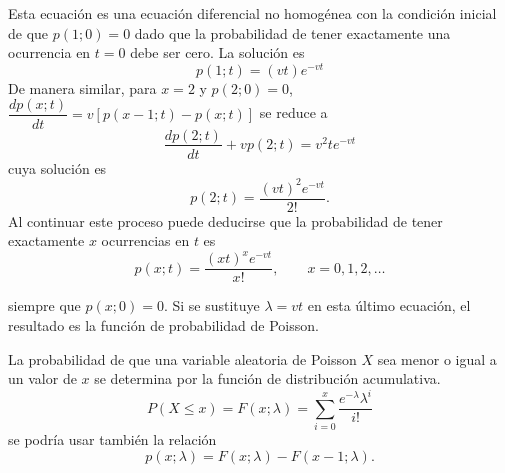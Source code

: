 Esta ecuación es una ecuación diferencial no homogénea con la condición inicial de que $p(1;0)=0$ dado que la probabilidad de tener exactamente una ocurrencia en $t=0$ debe ser cero.  La solución es
$$p(1;t)=(vt) e^{-vt}$$
De manera similar, para $x=2$ y $p(2;0)=0$, $\dfrac{dp(x;t)}{dt}=v[p(x-1;t)-p(x;t)]$ se reduce a
$$\dfrac{dp(2;t)}{dt} + vp(2;t) = v^2te^{-vt}$$
cuya solución es 
$$p(2;t)=\dfrac{(vt)^2e^{-vt}}{2!}.$$
Al continuar este proceso puede deducirse que la probabilidad de tener exactamente $x$ ocurrencias en $t$ es 
$$p(x;t)=\dfrac{(xt)^x e^{-vt}}{x!},\qquad x=0,1,2,\ldots$$

siempre que $p(x;0)=0$. Si se sustituye $\lambda =vt$ en esta último ecuación, el resultado es la función de probabilidad de Poisson.\\

\begin{tcolorbox}[colback=white]
    La probabilidad de que una variable aleatoria de Poisson $X$ sea menor o igual a un valor de $x$ se determina por la función de distribución acumulativa.
    $$P(X\leq x)=F(x;\lambda)=\sum_{i=0}^x \dfrac{e^{-\lambda} \lambda^i}{i!}$$
    se podría usar también la relación
    $$p(x;\lambda) = F(x;\lambda)-F(x-1;\lambda).$$
\end{tcolorbox}

